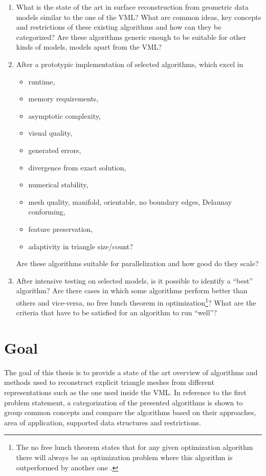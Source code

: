 \begin{enumerate}
	\item What is the state of the art in surface reconstruction from geometric data models similar to the one of the VML?
	What are common ideas, key concepts and restrictions of these existing algorithms and how can they be categorized?
	Are these algorithms generic enough to be suitable for other kinds of models, \ie models apart from the VML?

	\item After a prototypic implementation of selected algorithms, which excel in
	\begin{itemize}
		\item runtime,
		\item memory requirements,
		\item asymptotic complexity,
		\item visual quality,
		\item generated errors,
		\item divergence from exact solution,
		\item numerical stability,
		\item mesh quality, \eg manifold, orientable, no boundary edges, Delaunay conforming,
		\item feature preservation,
		\item adaptivity in triangle size/count?
	\end{itemize}
	Are these algorithms suitable for parallelization and how good do they scale?

	\item After intensive testing on selected models, is it possible to identify a \enquote{best} algorithm?
	Are there cases in which some algorithms perform better than others and vice-versa, \cf no free lunch theorem in optimization\footnote{The no free lunch theorem states that for any given optimization algorithm there will always be an optimization problem where this algorithm is outperformed by another one \cite{no_free_lunch}.}?
	What are the criteria that have to be satisfied for an algorithm to run \enquote{well}?
\end{enumerate}


\section{Goal}
\label{sec:goal}

The goal of this thesis is to provide a state of the art overview of algorithms and methods used to reconstruct explicit triangle meshes from different representations such as the one used inside the VML.
In reference to the first problem statement, a categorization of the presented algorithms is shown to group common concepts and compare the algorithms based on their approaches, area of application, supported data structures and restrictions.

